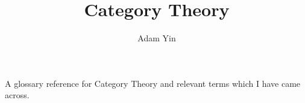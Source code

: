 \documentclass[a4paper]{article}
\title{Category Theory}
\author{Adam Yin}
\date{}
\begin{document}
\maketitle
A glossary reference for Category Theory and relevant terms which I have
came across.

\clearpage

\glsaddall
{}
\printglossaries
\end{document}
